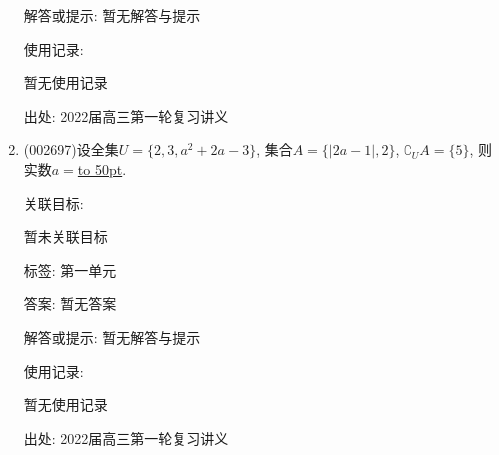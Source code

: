 \documentclass[10pt,a4paper]{article}
\newcommand{\blank}[1]{\underline{\hbox to #1pt{}}}
\begin{document}
\begin{enumerate}[1.]
解答或提示: 暂无解答与提示

使用记录:

暂无使用记录


出处: 2022届高三第一轮复习讲义
\item { (002697)}设全集$U=\{2,3,a^2+2a-3\}$, 集合$A=\{|2a-1|,2\}$, $\complement_U A=\{5\}$, 则实数$a=$\blank{50}.


关联目标:

暂未关联目标



标签: 第一单元

答案: 暂无答案

解答或提示: 暂无解答与提示

使用记录:

暂无使用记录


出处: 2022届高三第一轮复习讲义
\end{enumerate}
\end{document}
